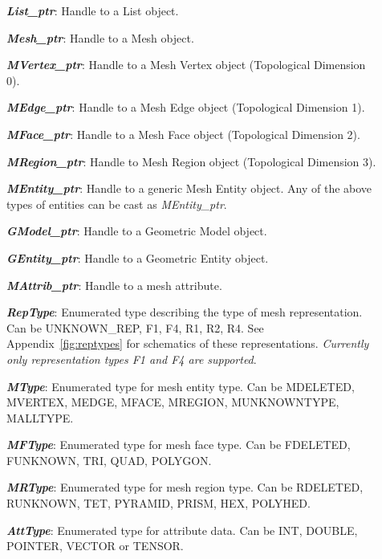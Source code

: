 \documentclass[12pt]{article}
\begin{document}
\begin{description}
\item[]{\bf {\em List\_ptr}}: Handle to a List object.

\item[]{\bf {\em Mesh\_ptr}}: Handle to a Mesh object.

\item[]{\bf {\em MVertex\_ptr}}: Handle to a Mesh Vertex object (Topological
Dimension 0).

\item[]{\bf {\em MEdge\_ptr}}: Handle to a Mesh Edge object (Topological Dimension 1).

\item[]{\bf {\em MFace\_ptr}}: Handle to a Mesh Face object (Topological Dimension 2).

\item[]{\bf {\em MRegion\_ptr}}: Handle to Mesh Region object (Topological Dimension 3).
  
\item[]{\bf {\em MEntity\_ptr}}: Handle to a generic Mesh Entity
  object. Any of the above types of entities can be cast as
  {\em MEntity\_ptr}.

\item[]{\bf {\em GModel\_ptr}}: Handle to a Geometric Model object.
\item[]{\bf {\em GEntity\_ptr}}: Handle to a Geometric Entity object.

\item[]{\bf {\em MAttrib\_ptr}}: Handle to a mesh attribute.
  
\item[]{\bf {\em RepType}}: Enumerated type describing the type
  of mesh representation.  Can be UNKNOWN\_REP, F1, F4, R1, R2, R4.
  See Appendix~\ref{fig:reptypes} for schematics of these
  representations. {\em Currently only representation types F1 and
    F4 are supported}.

\item[]{\bf {\em MType}}: Enumerated type for mesh entity type. Can be MDELETED, MVERTEX, MEDGE, MFACE, MREGION, MUNKNOWNTYPE, MALLTYPE.

\item[]{\bf {\em MFType}}: Enumerated type for mesh face type.
Can be FDELETED, FUNKNOWN, TRI, QUAD, POLYGON.

\item[]{\bf {\em MRType}}: Enumerated type for mesh region type.
Can be RDELETED, RUNKNOWN, TET, PYRAMID, PRISM, HEX, POLYHED.

\item[]{\bf {\em AttType}}: Enumerated type for attribute data. Can be INT, DOUBLE, POINTER, VECTOR or TENSOR.
\end{description}
\end{document}
